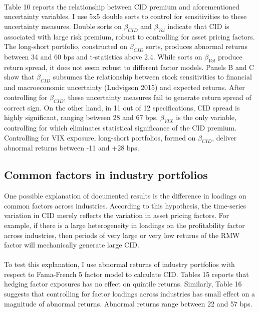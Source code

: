 \documentclass[12pt]{article}
\begin{document}
\paragraph{}
Table 10 reports the relationship between CID premium and aforementioned uncertainty variables. I use 5x5 double sorts to control for sensitivities to these uncertainty measures. Double sorts on $\beta_{CID}$ and $\beta_{Vol}$ indicate that CID is associated with large risk premium, robust to controlling for asset pricing factors. The long-short portfolio, constructed on $\beta_{CID}$ sorts, produces abnormal returns between 34 and 60 bps and t-statistics above 2.4. While sorts on $\beta_{Vol}$ produce return spread, it does not seem robust to different factor models. Panels B and C show that $\beta_{CID}$ subsumes the relationship between stock sensitivities to financial and macroeconomic uncertainty (Ludvigson 2015) and expected returns. After controlling for $\beta_{CID}$, these uncertainty measures fail to generate return spread of correct sign. On the other hand, in 11 out of 12 specifications, CID spread is highly significant, ranging between 28 and 67 bps.
$\beta_{VIX}$ is the only variable, controlling for which eliminates statistical significance of the CID premium. Controlling for VIX exposure, long-short portfolios, formed on $\beta_{CID}$, deliver abnormal returns between -11 and +28 bps. 

\subsection{Common factors in industry portfolios}

One possible explanation of documented results is the difference in loadings on common factors across industries. According to this hypothesis, the time-series variation in CID merely reflects the variation in asset pricing factors. For example, if there is a large heterogeneity in loadings on the profitability factor across industries, then periods of very large or very low returns of the RMW factor will mechanically generate large CID.
\paragraph{}
To test this explanation, I use abnormal returns of industry portfolios with respect to Fama-French 5 factor model to calculate CID. Tables 15 reports that hedging factor exposures has no effect on quintile returns. Similarly, Table 16 suggests that controlling for factor loadings across industries has small effect on a magnitude of abnormal returns. Abnormal returns range between 22 and 57 bps. 
\end{document}

